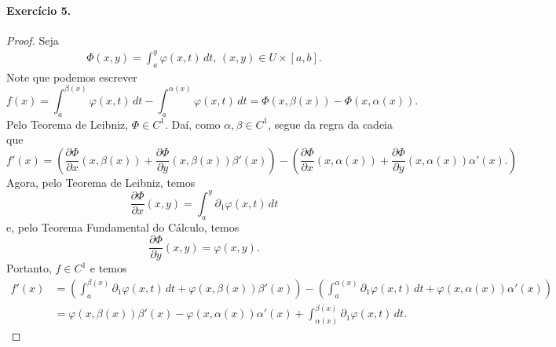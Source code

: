\documentclass[12pt,a4paper]{article}
\begin{document}
\paragraph{Exercício 5.} 
%
\begin{proof}
    Seja
    \begin{align*}
        \Phi(x, y) = \int_a^y \varphi(x, t) \, dt, \, (x, y) \in U \times [a,b].
    \end{align*}
    Note que podemos escrever
    \begin{equation*}
        f(x) = \int_a^{\beta(x)} \varphi(x, t) \, dt - \int_a^{\alpha(x)} \varphi(x, t) \, dt
             = \Phi(x, \beta(x)) - \Phi(x, \alpha(x)).
    \end{equation*}
    Pelo Teorema de Leibniz, $\Phi\in C^1$. Daí, como $\alpha, \beta \in C^1$, segue da
    regra da cadeia que
    \begin{equation*}
        f'(x) = 
        \left(
        \frac{\partial \Phi}{\partial x}(x, \beta(x)) 
        + \frac{\partial \Phi}{\partial y}(x, \beta(x))\beta'(x)
        \right)
        -
        \left(
        \frac{\partial \Phi}{\partial x}(x, \alpha(x)) 
        + \frac{\partial \Phi}{\partial y}(x, \alpha(x))\alpha'(x).
        \right)
    \end{equation*}
    Agora, pelo Teorema de Leibniz, temos
    \begin{equation*}
        \frac{\partial \Phi}{\partial x}(x, y) = \int_a^y \partial_1 \varphi(x, t) \, dt
    \end{equation*}
    e, pelo Teorema Fundamental do Cálculo, temos
    \begin{equation*}
        \frac{\partial \Phi}{\partial y}(x, y) = \varphi(x, y).
    \end{equation*}
    Portanto, $f\in C^1$ e temos
    \begin{align*}
        f'(x)
        &=
        \left(
        \int_a^{\beta(x)} \partial_1 \varphi(x, t) \, dt
        + 
        \varphi(x, \beta(x))\beta'(x)
        \right)
        -
        \left(
        \int_a^{\alpha(x)} \partial_1 \varphi(x, t) \, dt
        + 
        \varphi(x, \alpha(x))\alpha'(x)
        \right) \\
        &=
        \varphi(x, \beta(x))\beta'(x) 
        - 
        \varphi(x, \alpha(x))\alpha'(x)
        +
        \int_{\alpha(x)}^{\beta(x)} \partial_1 \varphi(x, t) \, dt.
    \end{align*}
\end{proof}
%
\end{document}
